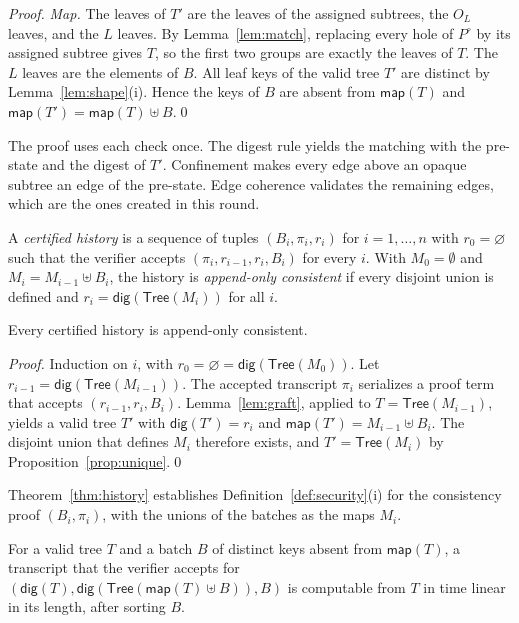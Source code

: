 \documentclass[runningheads]{llncs}
\newcommand{\dig}{\mathsf{dig}}
\newcommand{\Tree}{\mathsf{Tree}}
\newcommand{\map}{\mathsf{map}}
\begin{document}
\begin{proof}
\emph{Map.} The leaves of $T'$ are the leaves of the assigned subtrees, the $O_L$ leaves, and the $L$ leaves. By Lemma~\ref{lem:match}, replacing every hole of $P^{\circ}$ by its assigned subtree gives $T$, so the first two groups are exactly the leaves of $T$. The $L$ leaves are the elements of $B$. All leaf keys of the valid tree $T'$ are distinct by Lemma~\ref{lem:shape}(i). Hence the keys of $B$ are absent from $\map(T)$ and $\map(T') = \map(T) \uplus B$.\qed
\end{proof}

The proof uses each check once. The digest rule yields the matching with the pre-state and the digest of $T'$. Confinement makes every edge above an opaque subtree an edge of the pre-state. Edge coherence validates the remaining edges, which are the ones created in this round.

\begin{definition}\label{def:history}
A \emph{certified history} is a sequence of tuples $(B_i,\pi_i,r_i)$ for $i = 1,\ldots,n$
with $r_0 = \varnothing$ such that the verifier accepts $(\pi_i, r_{i-1}, r_i, B_i)$ for every $i$.
With $M_0 = \emptyset$ and $M_i = M_{i-1} \uplus B_i$, the history is
\emph{append-only consistent} if every disjoint union is defined and
$r_i = \dig(\Tree(M_i))$ for all $i$.
\end{definition}

\begin{theorem}\label{thm:history}
Every certified history is append-only consistent.
\end{theorem}
\begin{proof}
Induction on $i$, with $r_0 = \varnothing = \dig(\Tree(M_0))$. Let $r_{i-1} = \dig(\Tree(M_{i-1}))$. The accepted transcript $\pi_i$ serializes a proof term that accepts $(r_{i-1}, r_i, B_i)$. Lemma~\ref{lem:graft}, applied to $T = \Tree(M_{i-1})$, yields a valid tree $T'$ with $\dig(T') = r_i$ and $\map(T') = M_{i-1} \uplus B_i$. The disjoint union that defines $M_i$ therefore exists, and $T' = \Tree(M_i)$ by Proposition~\ref{prop:unique}.\qed
\end{proof}

Theorem~\ref{thm:history} establishes Definition~\ref{def:security}(i) for the consistency proof $(B_i,\pi_i)$, with the unions of the batches as the maps $M_i$.

\begin{theorem}[Completeness]\label{thm:complete}
For a valid tree $T$ and a batch $B$ of distinct keys absent from $\map(T)$, a transcript that the verifier accepts for $(\dig(T), \dig(\Tree(\map(T) \uplus B)), B)$ is computable from $T$ in time linear in its length, after sorting $B$.
\end{theorem}
\end{document}
